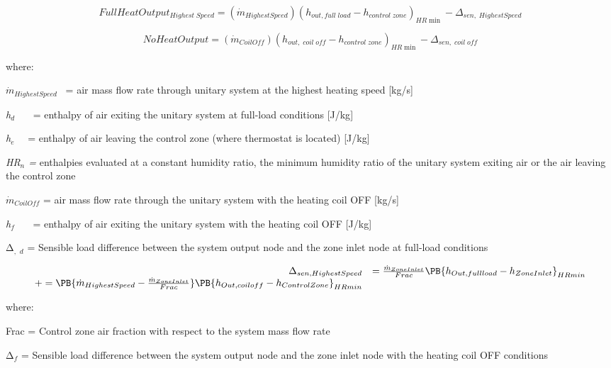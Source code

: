\begin{equation}
FullHeatOutpu{t_{Highest\;Speed}} = ({\dot m_{HighestSpeed}}){({h_{out,full\;load}} - {h_{control\;zone}})_{HR\min }} - {\Delta_{sen,\;HighestSpeed}}
\end{equation}

\begin{equation}
NoHeatOutput = ({\dot m_{CoilOff}}){({h_{out,\;coil\;off}} - {h_{control\;zone}})_{HR\min }} - {\Delta_{sen,\;coil\;off}}
\end{equation}

where:

\emph{\({\dot m_{HighestSpeed}}\)}~ = air mass flow rate through unitary system at the highest heating speed {[}kg/s{]}

\emph{h\(_{d}\)}~~~ = enthalpy of air exiting the unitary system at full-load conditions {[}J/kg{]}

\emph{h\(_{e}\)}~~ = enthalpy of air leaving the control zone (where thermostat is located) {[}J/kg{]}

\emph{HR\(_{n}\) =} enthalpies evaluated at a constant humidity ratio, the minimum humidity ratio of the unitary system exiting air or the air leaving the control zone

\({\dot m_{CoilOff}}\) = air mass flow rate through the unitary system with the heating coil OFF {[}kg/s{]}

\emph{h\(_{f}\)}~~~ = enthalpy of air exiting the unitary system with the heating coil OFF {[}J/kg{]}

Δ\(_{,}\) \emph{\(_{d}\)} = Sensible load difference between the system output node and the zone inlet node at full-load conditions

\begin{equation}
  \begin{array}{rl}
    \Delta_{sen,HighestSpeed} &= \frac{\dot{m}_{ZoneInlet}}{Frac} \PB{h_{Out,full load} - h_{ZoneInlet}}_{HRmin} \\
                              += \PB{\dot{m}_{HighestSpeed} - \frac{\dot{m}_{ZoneInlet}}{Frac}} \PB{h_{Out,coil off} - h_{ControlZone}}_{HRmin}
  \end{array}
\end{equation}

where:

Frac = Control zone air fraction with respect to the system mass flow rate

Δ\emph{\(_{f}\)} = Sensible load difference between the system output node and the zone inlet node with the heating coil OFF conditions

